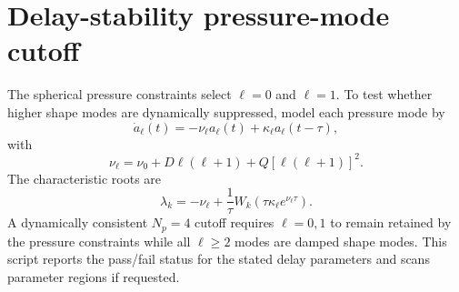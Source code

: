 \section{Delay-stability pressure-mode cutoff}
The spherical pressure constraints select \(\ell=0\) and \(\ell=1\).  To test
whether higher shape modes are dynamically suppressed, model each pressure mode
by
\[
  \dot a_\ell(t)=-\nu_\ell a_\ell(t)+\kappa_\ell a_\ell(t-\tau),
\]
with
\[
  \nu_\ell=\nu_0+D\ell(\ell+1)+Q[\ell(\ell+1)]^2.
\]
The characteristic roots are
\[
  \lambda_k
  =
  -\nu_\ell+\frac{1}{\tau}
  W_k\!\left(\tau\kappa_\ell e^{\nu_\ell\tau}\right).
\]
A dynamically consistent \(N_p=4\) cutoff requires \(\ell=0,1\) to remain
retained by the pressure constraints while all \(\ell\ge2\) modes are damped
shape modes.  This script reports the pass/fail status for the stated delay
parameters and scans parameter regions if requested.
